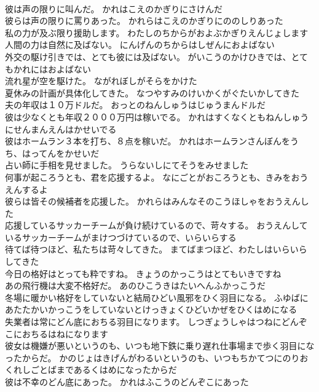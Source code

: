 \documentclass[8pt]{extreport}
\begin{document}
\begin{CJK}{UTF8}{min}
\\	彼は声の限りに叫んだ。	かれはこえのかぎりにさけんだ 
\\	彼らは声の限りに罵りあった。	かれらはこえのかぎりにののしりあった 
\\	私の力が及ぶ限り援助します。	わたしのちからがおよぶかぎりえんじょします 
\\	人間の力は自然に及ばない。	にんげんのちからはしぜんにおよばない 
\\	外交の駆け引きでは、とても彼には及ばない。	がいこうのかけひきでは、とてもかれにはおよばない 
\\	流れ星が空を駆けた。	ながれぼしがそらをかけた 
\\	夏休みの計画が具体化してきた。	なつやすみのけいかくがぐたいかしてきた 
\\	夫の年収は１０万ドルだ。	おっとのねんしゅうはじゅうまんドルだ 
\\	彼は少なくとも年収２０００万円は稼いでる。	かれはすくなくともねんしゅうにせんまんえんはかせいでる 
\\	彼はホームラン３本を打ち、８点を稼いだ。	かれはホームランさんぼんをうち、はってんをかせいだ 
\\	占い師に手相を見せました。	うらないしにてそうをみせました 
\\	何事が起ころうとも、君を応援するよ。	なにごとがおころうとも、きみをおうえんするよ 
\\	彼らは皆その候補者を応援した。	かれらはみんなそのこうほしゃをおうえんした 
\\	応援しているサッカーチームが負け続けているので、苛々する。	おうえんしているサッカーチームがまけつづけているので、いらいらする 
\\	待てば待つほど、私たちは苛々してきた。	まてばまつほど、わたしはいらいらしてきた 
\\	今日の格好はとっても粋ですね。	きょうのかっこうはとてもいきですね 
\\	あの飛行機は大変不格好だ。	あのひこうきはたいへんふかっこうだ 
\\	冬場に暖かい格好をしていないと結局ひどい風邪をひく羽目になる。	ふゆばにあたたかいかっこうをしていないとけっきょくひどいかぜをひくはめになる 
\\	失業者は常にどん底におちる羽目になります。	しつぎょうしゃはつねにどんぞこにおちるはねになります 
\\	彼女は機嫌が悪いというのも、いつも地下鉄に乗り遅れ仕事場まで歩く羽目になったからだ。	かのじょはきげんがわるいというのも、いつもちかてつにのりおくれしごとばまであるくはめになったからだ 
\\	彼は不幸のどん底にあった。	かれはふこうのどんぞこにあった 

\end{CJK}
\end{document}

